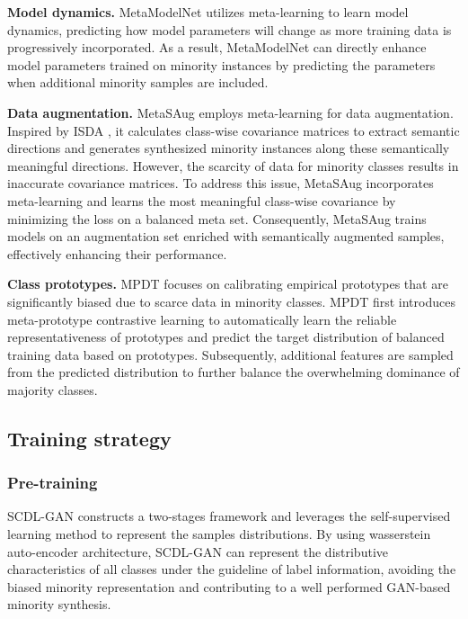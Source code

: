 \textbf{Model dynamics.}
MetaModelNet \cite{wang2017learning} utilizes meta-learning to learn model dynamics, predicting how model parameters will change as more training data is progressively incorporated. As a result, MetaModelNet can directly enhance model parameters trained on minority instances by predicting the parameters when additional minority samples are included.

\textbf{Data augmentation.}
MetaSAug \cite{li2021metasaug} employs meta-learning for data augmentation. Inspired by ISDA \cite{wang2019implicit}, it calculates class-wise covariance matrices to extract semantic directions and generates synthesized minority instances along these semantically meaningful directions. However, the scarcity of data for minority classes results in inaccurate covariance matrices. To address this issue, MetaSAug incorporates meta-learning and learns the most meaningful class-wise covariance by minimizing the loss on a balanced meta set. Consequently, MetaSAug trains models on an augmentation set enriched with semantically augmented samples, effectively enhancing their performance.

\textbf{Class prototypes.}
MPDT \cite{fu2022meta} focuses on calibrating empirical prototypes that are significantly biased due to scarce data in minority classes. MPDT first introduces meta-prototype contrastive learning to automatically learn the reliable representativeness of prototypes and predict the target distribution of balanced training data based on prototypes. Subsequently, additional features are sampled from the predicted distribution to further balance the overwhelming dominance of majority classes.


\subsection{Training strategy}
\subsubsection{Pre-training}
SCDL-GAN \cite{cai2019supervised} constructs a two-stages framework and leverages the self-supervised learning method to represent the samples distributions. By using wasserstein auto-encoder architecture, SCDL-GAN can represent the distributive characteristics of all classes under the guideline of label information, avoiding the biased minority representation and contributing to a well performed GAN-based minority synthesis.


